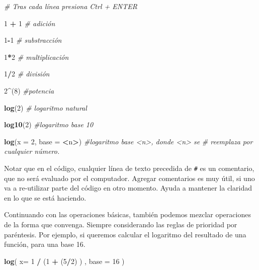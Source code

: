 \documentclass[12pt,letterpaper,]{book}
\newenvironment{Shaded}{\begin{snugshade}}{\end{snugshade}}
\newcommand{\KeywordTok}[1]{\textcolor[rgb]{0.13,0.29,0.53}{\textbf{#1}}}
\newcommand{\DataTypeTok}[1]{\textcolor[rgb]{0.13,0.29,0.53}{#1}}
\newcommand{\DecValTok}[1]{\textcolor[rgb]{0.00,0.00,0.81}{#1}}
\newcommand{\StringTok}[1]{\textcolor[rgb]{0.31,0.60,0.02}{#1}}
\newcommand{\CommentTok}[1]{\textcolor[rgb]{0.56,0.35,0.01}{\textit{#1}}}
\newcommand{\OperatorTok}[1]{\textcolor[rgb]{0.81,0.36,0.00}{\textbf{#1}}}
\newcommand{\NormalTok}[1]{#1}
\begin{document}
\begin{Shaded}
\begin{Highlighting}[]
\CommentTok{# Tras cada línea presiona Ctrl + ENTER}

\DecValTok{1} \OperatorTok{+}\StringTok{ }\DecValTok{1} \CommentTok{# adición}

\DecValTok{1}\OperatorTok{-}\DecValTok{1} \CommentTok{# substracción}

\DecValTok{1}\OperatorTok{*}\DecValTok{2} \CommentTok{# multiplicación}

\DecValTok{1}\OperatorTok{/}\DecValTok{2} \CommentTok{# división}

\DecValTok{2}\OperatorTok{^}\NormalTok{(}\DecValTok{8}\NormalTok{) }\CommentTok{#potencia}

\KeywordTok{log}\NormalTok{(}\DecValTok{2}\NormalTok{) }\CommentTok{# logaritmo natural}

\KeywordTok{log10}\NormalTok{(}\DecValTok{2}\NormalTok{) }\CommentTok{#logaritmo base 10}

\KeywordTok{log}\NormalTok{(}\DataTypeTok{x =} \DecValTok{2}\NormalTok{, }\DataTypeTok{base =} \OperatorTok{<}\NormalTok{n}\OperatorTok{>}\NormalTok{) }\CommentTok{#logaritmo base <n>, donde <n> se}
                       \CommentTok{#   reemplaza por cualquier número.}
\end{Highlighting}
\end{Shaded}

Notar que en el código, cualquier línea de texto precedida de
\texttt{\#} es un comentario, que no será evaluado por el computador.
Agregar comentarios es muy útil, si uno va a re-utilizar parte del
código en otro momento. Ayuda a mantener la claridad en lo que se está
haciendo.

Continuando con las operaciones básicas, también podemos mezclar
operaciones de la forma que convenga. Siempre considerando las reglas de
prioridad por paréntesis. Por ejemplo, si queremos calcular el logaritmo
del resultado de una función, para una base 16.

\begin{Shaded}
\begin{Highlighting}[]
\KeywordTok{log}\NormalTok{( }\DataTypeTok{x=} \DecValTok{1} \OperatorTok{/}\StringTok{ }\NormalTok{(}\DecValTok{1} \OperatorTok{+}\StringTok{ }\NormalTok{(}\DecValTok{5}\OperatorTok{/}\DecValTok{2}\NormalTok{) ) , }\DataTypeTok{base =} \DecValTok{16}\NormalTok{ )}
\end{Highlighting}
\end{Shaded}
\end{document}
